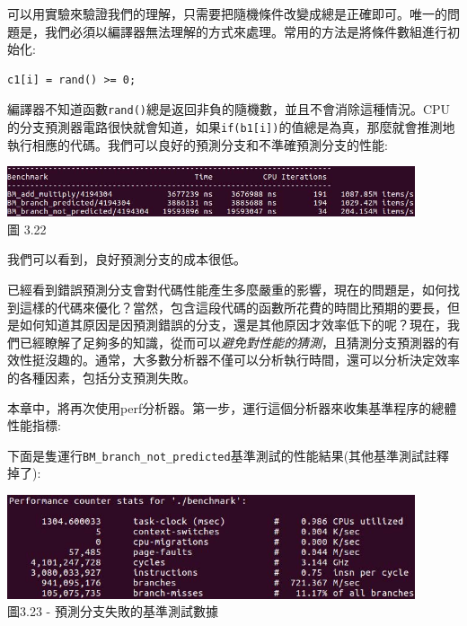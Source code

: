 可以用實驗來驗證我們的理解，只需要把隨機條件改變成總是正確即可。唯一的問題是，我們必須以編譯器無法理解的方式來處理。常用的方法是將條件數組進行初始化:

\begin{lstlisting}[style=styleCXX]
c1[i] = rand() >= 0;
\end{lstlisting}

編譯器不知道函數\texttt{rand()}總是返回非負的隨機數，並且不會消除這種情況。CPU的分支預測器電路很快就會知道，如果\texttt{if(b1[i])}的值總是為真，那麼就會推測地執行相應的代碼。我們可以良好的預測分支和不準確預測分支的性能:

\begin{center}
\includegraphics[width=0.9\textwidth]{content/1/chapter3/images/22.jpg}\\
圖 3.22
\end{center}

我們可以看到，良好預測分支的成本很低。


已經看到錯誤預測分支會對代碼性能產生多麼嚴重的影響，現在的問題是，如何找到這樣的代碼來優化？當然，包含這段代碼的函數所花費的時間比預期的要長，但是如何知道其原因是因預測錯誤的分支，還是其他原因才效率低下的呢？現在，我們已經瞭解了足夠多的知識，從而可以\textit{避免對性能的猜測}，且猜測分支預測器的有效性挺沒趣的。通常，大多數分析器不僅可以分析執行時間，還可以分析決定效率的各種因素，包括分支預測失敗。

本章中，將再次使用perf分析器。第一步，運行這個分析器來收集基準程序的總體性能指標:


下面是隻運行\texttt{BM\_branch\_not\_predicted}基準測試的性能結果(其他基準測試註釋掉了):

\begin{center}
\includegraphics[width=0.9\textwidth]{content/1/chapter3/images/23.jpg}\\
圖3.23 - 預測分支失敗的基準測試數據
\end{center}

